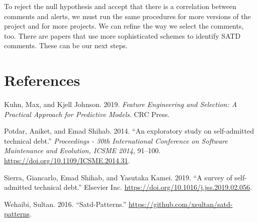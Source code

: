 \documentclass[
]{article}
\begin{document}
\normalsize

To reject the null hypothesis and accept that there
is a correlation between comments and alerts, we must run the same
procedures for more versions of the project and for more projects. We
can refine the way we select the comments, too. There are papers that
use more sophisticated schemes to identify SATD comments. These can be
our next steps.

\section{References}

\hypertarget{refs}{}
\leavevmode\hypertarget{ref-kuhn2019feature}{}%
Kuhn, Max, and Kjell Johnson. 2019. \emph{Feature Engineering and
Selection: A Practical Approach for Predictive Models}. CRC Press.

\leavevmode\hypertarget{ref-Potdar2014}{}%
Potdar, Aniket, and Emad Shihab. 2014. ``An exploratory study on
self-admitted technical debt.'' \emph{Proceedings - 30th International
Conference on Software Maintenance and Evolution, ICSME 2014}, 91--100.
\url{https://doi.org/10.1109/ICSME.2014.31}.

\leavevmode\hypertarget{ref-Sierra2019}{}%
Sierra, Giancarlo, Emad Shihab, and Yasutaka Kamei. 2019. ``A survey of
self-admitted technical debt.'' Elsevier Inc.
\url{https://doi.org/10.1016/j.jss.2019.02.056}.

\leavevmode\hypertarget{ref-Wehaibi2016}{}%
Wehaibi, Sultan. 2016. ``Satd-Patterns.''
\url{https://github.com/xsultan/satd-patterns}.
\end{document}
